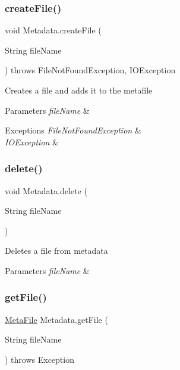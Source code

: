 \subsubsection{\texorpdfstring{create\+File()}{createFile()}}
{\footnotesize\ttfamily void Metadata.\+create\+File (\begin{DoxyParamCaption}\item[{String}]{file\+Name }\end{DoxyParamCaption}) throws File\+Not\+Found\+Exception, I\+O\+Exception\hspace{0.3cm}{\ttfamily [inline]}}

Creates a file and adds it to the metafile 
\begin{DoxyParams}{Parameters}
{\em file\+Name} & \\
\hline
\end{DoxyParams}

\begin{DoxyExceptions}{Exceptions}
{\em File\+Not\+Found\+Exception} & \\
\hline
{\em I\+O\+Exception} & \\
\hline
\end{DoxyExceptions}
\mbox{\label{class_metadata_a84c1111ef377e908c90bf9afb6006e20}} 
\subsubsection{\texorpdfstring{delete()}{delete()}}
{\footnotesize\ttfamily void Metadata.\+delete (\begin{DoxyParamCaption}\item[{String}]{file\+Name }\end{DoxyParamCaption})\hspace{0.3cm}{\ttfamily [inline]}}

Deletes a file from metadata 
\begin{DoxyParams}{Parameters}
{\em file\+Name} & \\
\hline
\end{DoxyParams}
\mbox{\label{class_metadata_ae29cb4e7e73fdda5a3649e085863d481}} 
\subsubsection{\texorpdfstring{get\+File()}{getFile()}}
{\footnotesize\ttfamily \mbox{\hyperlink{class_meta_file}{Meta\+File}} Metadata.\+get\+File (\begin{DoxyParamCaption}\item[{String}]{file\+Name }\end{DoxyParamCaption}) throws Exception\hspace{0.3cm}{\ttfamily [inline]}}


